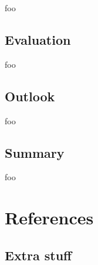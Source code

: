 \documentclass[letter,12pt]{article}
\begin{document}
foo

\subsection{Evaluation}

foo

\subsection{Outlook}

foo

\subsection{Summary}

foo

\vfill
\clearpage %

\section{References}
\printbibliography[heading=none]

\vfill
\clearpage %

\begin{appendices}

\section{Extra stuff}
\label{appendix:rthpss}

\end{appendices}
\end{document}
